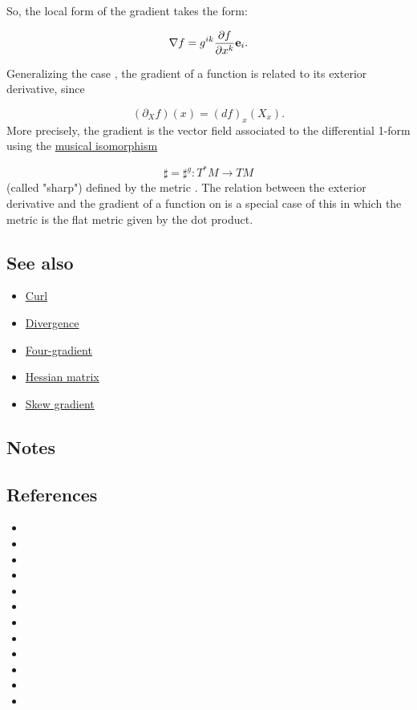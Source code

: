 \documentclass[
]{article}
\providecommand{\tightlist}{%
  \setlength{\itemsep}{0pt}\setlength{\parskip}{0pt}}
\begin{document}
So, the local form of the gradient takes the form:

\[\nabla f = g^{ik} \frac{\partial f}{\partial x^k} {\textbf e}_i .\]

Generalizing the case , the gradient of a function is related to its
exterior derivative, since

\[(\partial_X f) (x) = (df)_x(X_x) .\] More precisely, the gradient is
the vector field associated to the differential 1-form using the
\href{musical_isomorphism}{musical isomorphism}

\[\sharp=\sharp^g\colon T^*M\to TM\] (called "sharp") defined by the
metric . The relation between the exterior derivative and the gradient
of a function on is a special case of this in which the metric is the
flat metric given by the dot product.

\hypertarget{see_also}{%
\subsection{See also}\label{see_also}}

\begin{itemize}
\tightlist
\item
  \href{Curl_(mathematics)}{Curl}
\item
  \url{Divergence}
\item
  \url{Four-gradient}
\item
  \href{Hessian_matrix}{Hessian matrix}
\item
  \href{Skew_gradient}{Skew gradient}
\end{itemize}

\hypertarget{notes}{%
\subsection{Notes}\label{notes}}

\hypertarget{references}{%
\subsection{References}\label{references}}

\begin{itemize}
\item
\item
\item
\item
\item
\item
\item
\item
\item
\item
\item
\item
\end{itemize}
\end{document}
